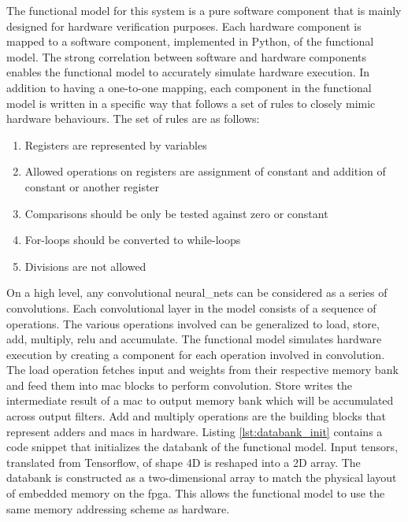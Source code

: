 \documentclass{uw-ece-wkrpt}
\begin{document}
The functional model for this system is a pure software component that is mainly designed for hardware verification purposes. Each hardware component is mapped to a software component, implemented in Python, of the functional model. The strong correlation between software and hardware components enables the functional model to accurately simulate hardware execution. In addition to having a one-to-one mapping, each component in the functional model is written in a specific way that follows a set of rules to closely mimic hardware behaviours. The set of rules are as follows:
\begin{enumerate}
    \item Registers are represented by variables
    \item Allowed operations on registers are assignment of constant and addition of constant or another register
    \item Comparisons should be only be tested against zero or constant
    \item For-loops should be converted to while-loops
    \item Divisions are not allowed
\end{enumerate}

On a high level, any convolutional \glspl{neural_net} can be considered as a series of convolutions.  Each convolutional layer in the model consists of a sequence of operations. The various operations involved can be generalized to load, store, add, multiply, \gls{relu} and accumulate. The functional model simulates hardware execution by creating a component for each operation involved in convolution. The load operation fetches input and weights from their respective memory bank and feed them into \gls{mac} blocks to perform convolution. Store writes the intermediate result of a \gls{mac} to output memory bank which will be accumulated across output \glspl{filter}. Add and multiply operations are the building blocks that represent adders and \glspl{mac} in hardware. Listing \ref{lst:databank_init} contains a code snippet that initializes the databank of the functional model. Input \glspl{tensor}, translated from Tensorflow, of shape 4D is reshaped into a 2D array. The databank is constructed as a two-dimensional array to match the physical layout of embedded memory on the \gls{fpga}. This allows the functional model to use the same memory addressing scheme as hardware.
\end{document}
